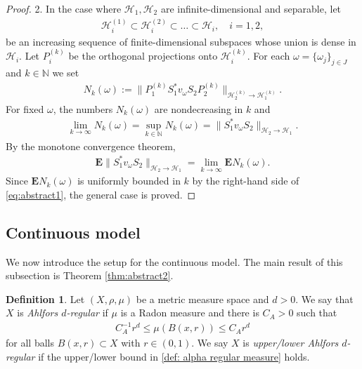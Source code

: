 \documentclass[12pt,reqno]{amsart}
\theoremstyle{definition}
\newtheorem{definition}[theorem]{Definition}
\theoremstyle{remark}
\numberwithin{equation}{section}
\newcommand{\1}{\mathbbm{1}}
\newcommand{\N}{\mathbb{N}}
\begin{document}
\begin{proof}
2. In the case where $\mathcal{H}_1,\mathcal{H}_2$ are infinite-dimensional and separable, let 
\begin{align*}
    \mathcal{H}_i^{(1)}\subset \mathcal{H}_i^{(2)}\subset\ldots\subset \mathcal{H}_i,\quad i=1,2,
\end{align*}
be an increasing sequence of finite-dimensional subspaces whose union is dense in $\mathcal{H}_i$. Let $P_i^{(k)}$ be the orthogonal projections onto $\mathcal{H}_i^{(k)}$. For each $\omega=\{\omega_j\}_{j\in J}$ and $k\in\N$ we set
\begin{align*}
N_k(\omega):=\|P_1^{(k)}S_1^*v_{\omega}S_2P_2^{(k)}\|_{\mathcal{H}_2^{(k)}\to \mathcal{H}_1^{(k)}}.
\end{align*}
For fixed $\omega$, the numbers $N_k(\omega)$ are nondecreasing in $k$ and 
\begin{align*}
\lim_{k\to\infty}N_k(\omega)=\sup_{k\in\N} N_k(\omega)=\|S_1^*v_{\omega}S_2\|_{\mathcal{H}_2\to \mathcal{H}_1}.
\end{align*}
By the monotone convergence theorem,
\begin{align*}
\mathbf{E}\|S_1^*v_{\omega}S_2\|_{\mathcal{H}_2\to \mathcal{H}_1}=\lim_{k\to\infty}\mathbf{E}N_k(\omega).
\end{align*}
Since $\mathbf{E}N_k(\omega)$ is uniformly bounded in $k$ by the right-hand side of \eqref{eq:abstract1}, the general case is proved.
\end{proof}

\subsection{Continuous model}\label{sec:abstract}
We now introduce the setup for the continuous model. The main result of this subsection is Theorem \ref{thm:abstract2}.

\begin{definition}
\label{defdef: alpha regular measure}
  Let $(X,\rho,\mu)$ be a metric measure space and $d>0$. We say that $X$ is \emph{Ahlfors $d$-regular} if $\mu$ is a Radon measure and there is $C_A>0$ such that
  \begin{align}\label{def: alpha regular measure}
    C_A^{-1}r^{d} 
    \leq \mu(B(x,r))
    \leq C_A r^{d}
\end{align}
  for all balls $B(x,r)\subset X$ with $r\in (0,1)$. 
  We say $X$ is \emph{upper/lower Ahlfors $d$-regular} if the upper/lower bound in \eqref{def: alpha regular measure} holds.
\end{definition}
\end{document}
